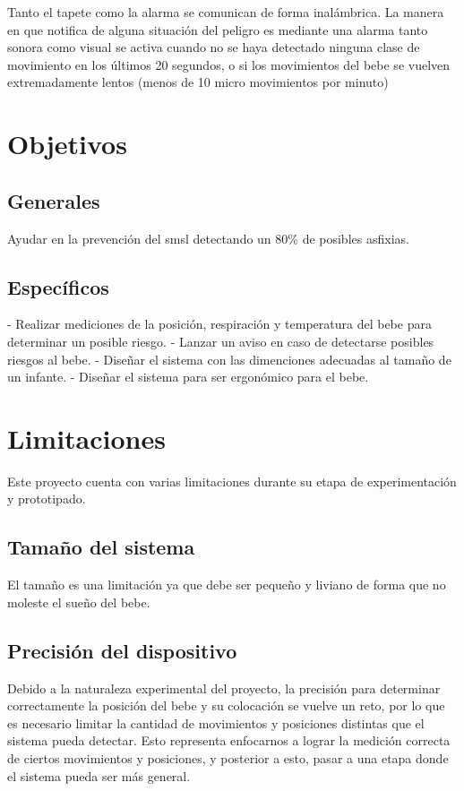 Tanto el tapete como la alarma se comunican de forma inalámbrica.
La manera en que notifica de alguna situación del peligro es mediante una alarma tanto sonora como visual se activa cuando no se haya detectado ninguna clase de movimiento en los últimos 20 segundos, o si los movimientos del bebe se vuelven extremadamente lentos (menos de 10 micro movimientos por minuto)

\section{Objetivos}

\subsection{Generales}

Ayudar en la prevención del \acrlong{smsl} detectando un 80\% de posibles asfixias.

\subsection{Específicos}

- Realizar mediciones de la posición, respiración y temperatura del bebe para determinar un posible riesgo.
- Lanzar un aviso en caso de detectarse posibles riesgos al bebe.
- Diseñar el sistema con las dimenciones adecuadas al tamaño de un infante.
- Diseñar el sistema para ser ergonómico para el bebe.

\section{Limitaciones}

Este proyecto cuenta con varias limitaciones durante su etapa de experimentación y prototipado.

\subsection{Tamaño del sistema}

El tamaño es una limitación ya que debe ser pequeño y liviano de forma que no moleste el sueño del bebe.

\subsection{Precisión del dispositivo}

Debido a la naturaleza experimental del proyecto, la precisión para determinar correctamente la posición del bebe y su colocación se vuelve un reto, por lo que es necesario limitar la cantidad de movimientos y posiciones distintas que el sistema pueda detectar.
Esto representa enfocarnos a lograr la medición correcta de ciertos movimientos y posiciones, y posterior a esto, pasar a una etapa donde el sistema pueda ser más general. 

